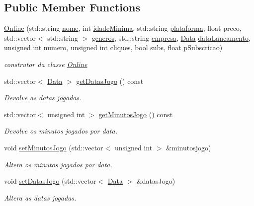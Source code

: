 \subsection*{Public Member Functions}
\begin{DoxyCompactItemize}
\item 
\hyperlink{classOnline_ae6a934ef34ed86ab205190f2b632366a}{Online} (std\+::string \hyperlink{classTitulo_a8abdf1fc6d4fc14be20bbec247664d83}{nome}, int \hyperlink{classTitulo_a28891078f53fc3317de60ae739514955}{idade\+Minima}, std\+::string \hyperlink{classTitulo_a67761eb7f006453ab0869e4b7c0a9c0b}{plataforma}, float preco, std\+::vector$<$ std\+::string $>$ \hyperlink{classTitulo_a3209265c8534416978ee9891b96c14b2}{generos}, std\+::string \hyperlink{classTitulo_a91510c440dc8583d60d88ea02f4eb1b6}{empresa}, \hyperlink{classData}{Data} \hyperlink{classTitulo_ae540ddf2c607eb0e4de29eb8c0cca7f0}{data\+Lancamento}, unsigned int numero, unsigned int cliques, bool subs, float p\+Subscricao)
\begin{DoxyCompactList}\small\item\em construtor da classe \hyperlink{classOnline}{Online} \end{DoxyCompactList}\item 
std\+::vector$<$ \hyperlink{classData}{Data} $>$ \hyperlink{classOnline_aa6f51a948cb5ffd2c7cbac1f1cd6023f}{get\+Datas\+Jogo} () const
\begin{DoxyCompactList}\small\item\em Devolve as datas jogadas. \end{DoxyCompactList}\item 
std\+::vector$<$ unsigned int $>$ \hyperlink{classOnline_a4ab18dfdaa0af23cda8f5268a9968887}{get\+Minutos\+Jogo} () const
\begin{DoxyCompactList}\small\item\em Devolve os minutos jogados por data. \end{DoxyCompactList}\item 
void \hyperlink{classOnline_a71cc818cd9b8020a470efc14f636a9f9}{set\+Minutos\+Jogo} (std\+::vector$<$ unsigned int $>$ \&minutosjogo)
\begin{DoxyCompactList}\small\item\em Altera os minutos jogados por data. \end{DoxyCompactList}\item 
void \hyperlink{classOnline_a3c0b8d3393271eabfa702629c979fb93}{set\+Datas\+Jogo} (std\+::vector$<$ \hyperlink{classData}{Data} $>$ \&datas\+Jogo)
\begin{DoxyCompactList}\small\item\em Altera as datas jogadas. \end{DoxyCompactList}\item 

\end{DoxyCompactItemize}
